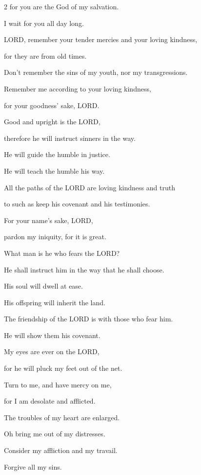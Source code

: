 \begin{multicols}{2}
	for you are the God of my salvation.
	
	I wait for you all day long.
	
	
	\myverse{}LORD, remember your tender mercies and your loving kindness,
	
	for they are from old times.
	
	
	\myverse{}Don’t remember the sins of my youth, nor my transgressions.
	
	Remember me according to your loving kindness,
	
	for your goodness’ sake, LORD.
	
	
	\myverse{}Good and upright is the LORD,
	
	therefore he will instruct sinners in the way.
	
	
	\myverse{}He will guide the humble in justice.
	
	He will teach the humble his way.
	
	
	\myverse{}All the paths of the LORD are loving kindness and truth
	
	to such as keep his covenant and his testimonies.
	
	
	\myverse{}For your name’s sake, LORD,
	
	pardon my iniquity, for it is great.
	
	
	\myverse{}What man is he who fears the LORD?
	
	He shall instruct him in the way that he shall choose.
	
	
	\myverse{}His soul will dwell at ease.
	
	His offspring will inherit the land.
	
	
	\myverse{}The friendship of the LORD is with those who fear him.
	
	He will show them his covenant.
	
	\vspace{\baselineskip}
	
	\myverse{}My eyes are ever on the LORD,
	
	for he will pluck my feet out of the net.
	
	
	\myverse{}Turn to me, and have mercy on me,
	
	for I am desolate and afflicted.
	
	
	\myverse{}The troubles of my heart are enlarged.
	
	Oh bring me out of my distresses.
	
	
	\myverse{}Consider my affliction and my travail.
	
	Forgive all my sins.
	

\end{multicols}
